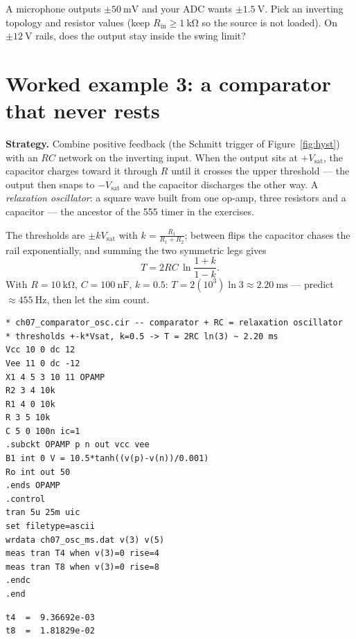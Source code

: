 \begin{exercise}
A microphone outputs $\pm\qty{50}{\milli\volt}$ and your ADC wants
$\pm\qty{1.5}{\volt}$. Pick an inverting topology and resistor values
(keep $R_{\mathrm{in}} \ge \qty{1}{\kilo\ohm}$ so the source is not
loaded). On $\pm\qty{12}{\volt}$ rails, does the output stay inside the
swing limit?
\end{exercise}

\section{Worked example 3: a comparator that never rests}
\label{sec:we-osc}

\textbf{Strategy.} Combine positive feedback (the Schmitt trigger of
Figure~\ref{fig:hyst}) with an $RC$ network on the inverting input. When
the output sits at $+V_{\mathrm{sat}}$, the capacitor charges toward it
through $R$ until it crosses the upper threshold — the output then snaps
to $-V_{\mathrm{sat}}$ and the capacitor discharges the other way. A
\emph{relaxation oscillator}: a square wave
built from one op-amp, three resistors and a capacitor — the ancestor of
the 555 timer in the exercises.

The thresholds are $\pm kV_{\mathrm{sat}}$ with $k = \frac{R_1}{R_1+R_2}$;
between flips the capacitor chases the rail exponentially, and summing
the two symmetric legs gives
\[
T = 2RC\,\ln\!\frac{1+k}{1-k}.
\]
With $R = \qty{10}{\kilo\ohm}$, $C = \qty{100}{\nano\farad}$, $k = 0.5$:
$T = 2(10^{3})\ln 3 \approx \qty{2.20}{\milli\second}$ — predict
$\approx\qty{455}{\hertz}$, then let the sim count.

\begin{lstlisting}[caption={\texttt{comparator\_osc.cir} --- relaxation
oscillator (the \texttt{ic=1} kicks it off the metastable zero)},label={lst:osc},abovecaptionskip=0pt]
* ch07_comparator_osc.cir -- comparator + RC = relaxation oscillator
* thresholds +-k*Vsat, k=0.5 -> T = 2RC ln(3) ~ 2.20 ms
Vcc 10 0 dc 12
Vee 11 0 dc -12
X1 4 5 3 10 11 OPAMP
R2 3 4 10k
R1 4 0 10k
R 3 5 10k
C 5 0 100n ic=1
.subckt OPAMP p n out vcc vee
B1 int 0 V = 10.5*tanh((v(p)-v(n))/0.001)
Ro int out 50
.ends OPAMP
.control
tran 5u 25m uic
set filetype=ascii
wrdata ch07_osc_ms.dat v(3) v(5)
meas tran T4 when v(3)=0 rise=4
meas tran T8 when v(3)=0 rise=8
.endc
.end
\end{lstlisting}

\begin{lstlisting}[caption={times of the 4th and 8th rising edges
(verbatim)},abovecaptionskip=0pt]
t4  =  9.36692e-03
t8  =  1.81829e-02
\end{lstlisting}

